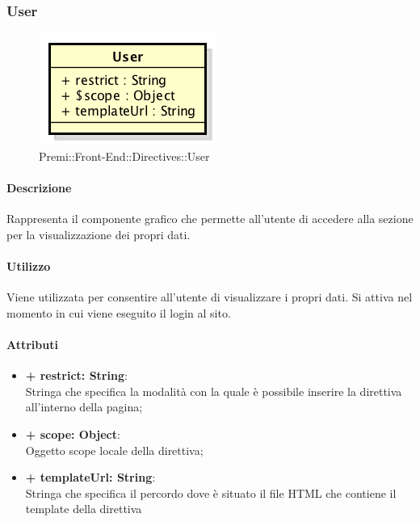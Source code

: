 \subsubsection{User}
	\begin{figure}[h]
		\centering
		\includegraphics[width=0.4\linewidth]{img/premi_front_end_directives_user}
		\caption[Premi::Front-End::Directives::User]{Premi::Front-End::Directives::User}
	\end{figure}
	
	\paragraph{Descrizione}
	Rappresenta il componente grafico che permette all'utente di accedere alla sezione per la visualizzazione dei propri dati.
	
	\paragraph{Utilizzo}
	Viene utilizzata per consentire all'utente di visualizzare i propri dati. Si attiva nel momento in cui viene eseguito il login al sito.
	
	\paragraph{Attributi}
	\begin{itemize}
		\item \textbf{+ restrict: String}:\\
			Stringa che specifica la modalità con la quale è possibile inserire la direttiva all'interno della pagina;
		\item \textbf{+ scope: Object}:\\
			Oggetto scope locale della direttiva;
		\item \textbf{+ templateUrl: String}:\\
			Stringa che specifica il percordo dove è situato il file \gls{HTML} che contiene il \gls{template} della direttiva
	\end{itemize}
\newpage
